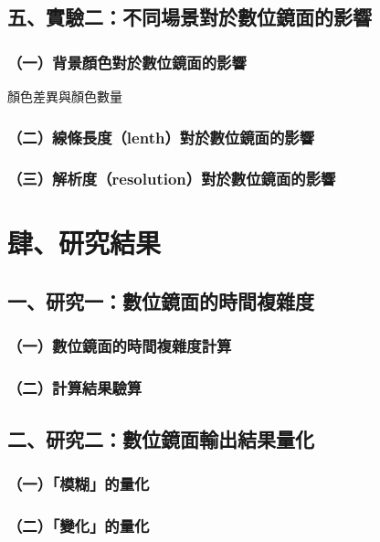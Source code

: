 \documentclass[12pt]{article}
\begin{document}
\subsection{五、實驗二：不同場景對於數位鏡面的影響}

\subsubsection{（一）背景顏色對於數位鏡面的影響}

顏色差異與顏色數量

\subsubsection{（二）線條長度（lenth）對於數位鏡面的影響}

\subsubsection{（三）解析度（resolution）對於數位鏡面的影響}

\newpage
\section{肆、研究結果}

\subsection{一、研究一：數位鏡面的時間複雜度}

\subsubsection{（一）數位鏡面的時間複雜度計算}

\subsubsection{（二）計算結果驗算}

\subsection{二、研究二：數位鏡面輸出結果量化}

\subsubsection{（一）「模糊」的量化}

\subsubsection{（二）「變化」的量化}
\end{document}
